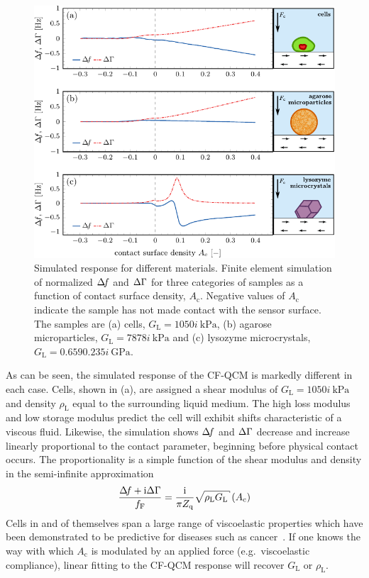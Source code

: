 \begin{figure}[ht]
 \centering
\includegraphics{qcm/figures/multisweep.pdf}
\caption{Simulated response for different materials.  Finite element simulation of normalized $\Delta\!f$ and $\Delta\Gamma$ for three
 categories of samples as a function of contact surface density,
 $A_\mathrm{c}$.
	Negative values of $A_\mathrm{c}$ indicate the sample has not made contact with the sensor
 surface.
 The samples are (a) cells, $G_\mathrm{L}=\SI{10+50i}{\kilo\pascal}$, (b)
 agarose microparticles, $G_\mathrm{L}=\SI{78+78i}{\kilo\pascal}$ and (c) lysozyme
 microcrystals, $G_\mathrm{L}=\SI{0.659+0.235i}{\giga\pascal}$.  }
\label{fig:multisweep}
\end{figure}

As can be seen, the simulated response of the CF-QCM is markedly different
in each case. Cells, shown in (a), are assigned a
shear modulus of
$G_\mathrm{L}=\SI{10+50i}{\kilo\pascal}$~\cite{li2008thickness}~\cite{mahaffy2004quantitative} and density
$\rho_\mathrm{L}$ equal to the surrounding liquid medium.  The high loss
modulus and low storage modulus predict the cell will exhibit shifts
characteristic of a viscous fluid.  Likewise, the simulation shows $\Delta\!f$
and $\Delta\Gamma$ decrease and increase linearly proportional to the contact
parameter, beginning before physical contact occurs.  The proportionality
is a simple function of the shear modulus and density in the
semi-infinite approximation~\cite{flanigan2000contact}~\cite{kanazawa1985frequency}
\begin{equation}
 \frac{\df+\mi\dg}{f_\mathrm{F}}=\frac{\mi}{\pi Z_\mathrm{q}}\sqrt{\rho_\mathrm{L} G_\mathrm{L}}
 \left(A_\mathrm{c}\right)
\end{equation}
 Cells in and of
themselves span a large range of viscoelastic properties which have been
demonstrated to be predictive for diseases such as
cancer~\cite{rebelo2013comparison}.  If one knows the way with which
$A_\mathrm{c}$ is modulated by an applied force (e.g.\ viscoelastic
compliance), linear fitting to
the CF-QCM response will recover $G_\mathrm{L}$ or $\rho_\mathrm{L}$.

